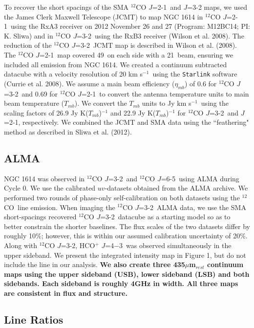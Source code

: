 \documentclass[preprint, 11pt]{aastex}
\newcommand{\co}{$^{12}$CO}
\newcommand{\cotwo}{$^{12}$CO $J$=2-1}
\newcommand{\cothree}{$^{12}$CO $J$=3-2}
\newcommand{\cosix}{$^{12}$CO $J$=6-5}
\newcommand{\kms}{km s$^{-1}$}
\newcommand{\hcofour}{HCO$^+$ $J$=4$-$3}
\begin{document}
To recover the short spacings of the SMA \cotwo\ and $J$=3-2 maps, we used the James Clerk Maxwell Telescope (JCMT) to map NGC 1614 in \cotwo\ using the RxA3 receiver on 2012 November 26 and 27 (Program: M12BC14; PI: K. Sliwa) and in \cothree\ using the RxB3 receiver (Wilson et al. 2008). The reduction of the \cothree\ JCMT map is described in Wilson et al. (2008). The \cotwo\ map covered 49\arcsec\ on each side with a 21\arcsec\ beam, ensuring we included all emission from NGC 1614. We created a continuum subtracted datacube with a velocity resolution of 20 \kms\ using the \verb!Starlink! software (Currie et al. 2008)\nocite{Currie2008}. We assume a main beam efficiency ($\eta_{mb}$) of 0.6 for \cothree\ and 0.69 for \cotwo\ to convert the antenna temperature units to main beam temperature ($T_{mb}$). We convert the $T_{mb}$ units to Jy \kms\ using the scaling factors of 26.9 Jy K($T_{mb}$)$^{-1}$ and 22.9 Jy K($T_{mb}$)$^{-1}$ for \cothree\ and $J$=2-1, respectively. We combined the JCMT and SMA data using the ``feathering" method as described in Sliwa et al. (2012)\nocite{Sliwa2012}. 

\subsection{ALMA}

NGC 1614 was observed in \cothree\ and \cosix\ using ALMA during Cycle 0.  We use the calibrated $uv$-datasets obtained from the ALMA archive. We performed two rounds of phase-only self-calibration on both datasets using the \co\ line emission. When imaging the \cothree\ ALMA data, we use the SMA short-spacings recovered \cothree\ datacube as a starting model so as to better constrain the shorter baselines.  The flux scales of the two datasets differ by roughly 10$\%$; however, this is within our assumed calibration uncertainty of 20$\%$. Along with \cothree, \hcofour\ was observed simultaneously in the upper sideband. We present the integrated intensity map in Figure 1, but do not include the line in our analysis. \textbf{We also create three 435$\mu$m$_{rest}$ continuum maps using the upper sideband (USB), lower sideband (LSB) and both sidebands. Each sideband is roughly 4GHz in width. All three maps are consistent in flux and structure. }
\subsection{Line Ratios}
\end{document}

